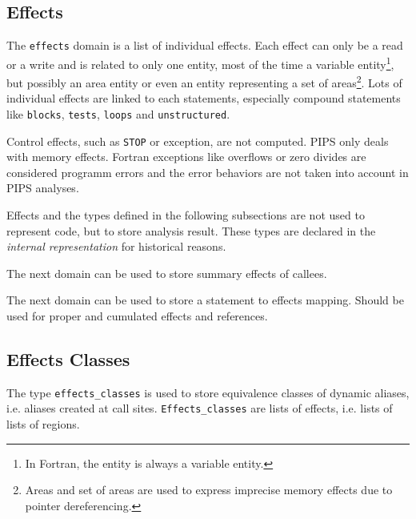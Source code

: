 \documentclass[a4paper]{article}
\begin{document}
\subsection{Effects}
\label{subsection-effects}

The \texttt{effects} domain is a list of individual effects. Each
effect can only be a read or a write and is related to only one
entity, most of the time a variable entity\footnote{In Fortran, the
  entity is always a variable entity.}, but possibly an area entity or
even an entity representing a set of areas\footnote{Areas and set of
  areas are used to express imprecise memory effects due to pointer
  dereferencing.}. Lots of individual effects are linked to each
statements, especially compound statements like \texttt{blocks},
\texttt{tests}, \texttt{loops} and \texttt{unstructured}.

Control effects, such as \verb/STOP/ or exception, are not
computed. PIPS only deals with memory effects. Fortran exceptions like
overflows or zero divides are considered programm errors and the error
behaviors are not taken into account in PIPS analyses.

Effects and the types defined in the following subsections are not used to
represent code, but to store analysis result. These types are declared in
the \emph{internal representation\/} for historical reasons.


The next domain can be used to store summary effects of callees.

{}

The next domain can be used to store a statement to effects mapping.
Should be used for proper and cumulated effects and references.

{}


\subsection{Effects Classes}
\label{subsection-effects-classes}

{}

The type \texttt{effects\_classes} is used to store equivalence classes of
dynamic aliases, i.e. aliases created at call sites. \texttt{Effects\_classes}
are lists of effects, i.e. lists of lists of regions.
\end{document}
